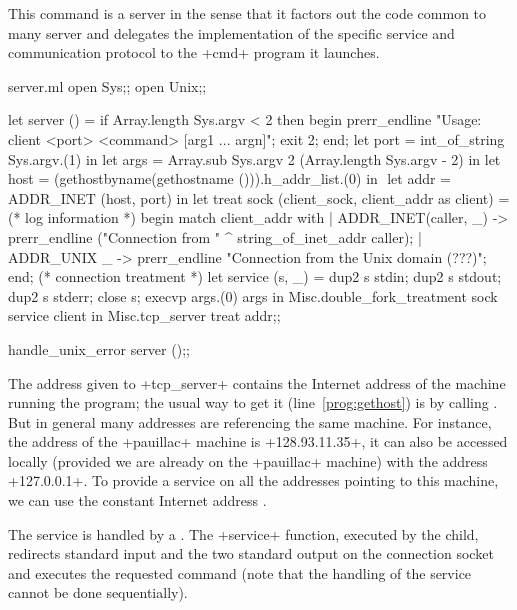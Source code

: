 This command is a  server in the sense that it factors
out the code common to many server and delegates the implementation of
the specific service and communication protocol to the \ml+cmd+ program it
launches.
%
\begin{listingcodefile}[style=numbers]{server.ml}
open Sys;;
open Unix;;

let server () =
  if Array.length Sys.argv < 2 then begin
    prerr_endline "Usage: client <port> <command> [arg1 ... argn]";
    exit 2;
  end;
  let port = int_of_string Sys.argv.(1) in
  let args = Array.sub Sys.argv 2 (Array.length Sys.argv - 2) in
  let host = (gethostbyname(gethostname ())).h_addr_list.(0) in $\label{prog:gethost}$
  let addr = ADDR_INET (host, port) in
  let treat sock (client_sock, client_addr as client) =
    (* log information *)
    begin match client_addr with
    | ADDR_INET(caller, _) ->
        prerr_endline ("Connection from " ^ string_of_inet_addr caller);
    | ADDR_UNIX _ ->
        prerr_endline "Connection from the Unix domain (???)";
    end;
    (* connection treatment *)
    let service (s, _) =
      dup2 s stdin; dup2 s stdout; dup2 s stderr; close s;
      execvp args.(0) args
    in
    Misc.double_fork_treatment sock service client in
  Misc.tcp_server treat addr;;

handle_unix_error server ();;
\end{listingcodefile}
% 
The address given to \ml+tcp_server+ contains the Internet address
of the machine running the program; the usual way to get it
(line~\ref{prog:gethost}) is by calling
. But in general many addresses are
referencing the same machine. For instance, the address of the
\ml+pauillac+ machine is \ml+128.93.11.35+, it can also be accessed
locally (provided we are already on the \ml+pauillac+ machine) with
the address \ml+127.0.0.1+. To provide a service on all the addresses
pointing to this machine, we can use the constant Internet address
.

The service is handled by a . The \ml+service+
function, executed by the child, redirects standard input and the two
standard output on the connection socket and executes the requested
command (note that the handling of the service cannot be done
sequentially).

